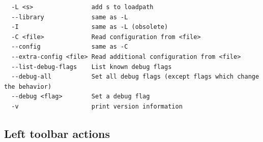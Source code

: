 
\begin{verbatim}
  -L <s>                add s to loadpath
  --library             same as -L
  -I                    same as -L (obsolete)
  -C <file>             Read configuration from <file>
  --config              same as -C
  --extra-config <file> Read additional configuration from <file>
  --list-debug-flags    List known debug flags
  --debug-all           Set all debug flags (except flags which change the behavior)
  --debug <flag>        Set a debug flag
  -v                    print version information
\end{verbatim}


\subsection{Left toolbar actions}

